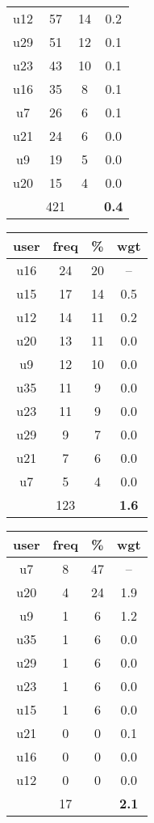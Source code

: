 \begin{appendices}
\begin{table}
\begin{tabular}{ |c|c|c|c| }
	u12 & 57 & 14 & 0.2 \\
	u29 & 51 & 12 & 0.1 \\
	u23 & 43 & 10 & 0.1 \\
	u16 & 35 & 8 & 0.1 \\
	u7 & 26 & 6 & 0.1 \\
	u21 & 24 & 6 & 0.0 \\
	u9 & 19 & 5 & 0.0 \\
	u20 & 15 & 4 & 0.0 \\
	 & 421 & & \textbf{0.4} \\
	\hline
\end{tabular}
\begin{tabular}{ |c|c|c|c| }
	\hline
	\textbf{user} & \textbf{freq} & \textbf{\%} & \textbf{wgt} \\
	\hline
	u16 & 24 & 20 & -- \\
	u15 & 17 & 14 & 0.5 \\
	u12 & 14 & 11 & 0.2 \\
	u20 & 13 & 11 & 0.0 \\
	u9 & 12 & 10 & 0.0 \\
	u35 & 11 & 9 & 0.0 \\
	u23 & 11 & 9 & 0.0 \\
	u29 & 9 & 7 & 0.0 \\
	u21 & 7 & 6 & 0.0 \\
	u7 & 5 & 4 & 0.0 \\
	 & 123 & & \textbf{1.6} \\
	\hline
\end{tabular}
\begin{tabular}{ |c|c|c|c| }
	\hline
	\textbf{user} & \textbf{freq} & \textbf{\%} & \textbf{wgt} \\
	\hline
	u7 & 8 & 47 & -- \\
	u20 & 4 & 24 & 1.9 \\
	u9 & 1 & 6 & 1.2 \\
	u35 & 1 & 6 & 0.0 \\
	u29 & 1 & 6 & 0.0 \\
	u23 & 1 & 6 & 0.0 \\
	u15 & 1 & 6 & 0.0 \\
	u21 & 0 & 0 & 0.1 \\
	u16 & 0 & 0 & 0.0 \\
	u12 & 0 & 0 & 0.0 \\
	 & 17 & & \textbf{2.1} \\
	\hline
\end{tabular}

\end{table}
\end{appendices}
